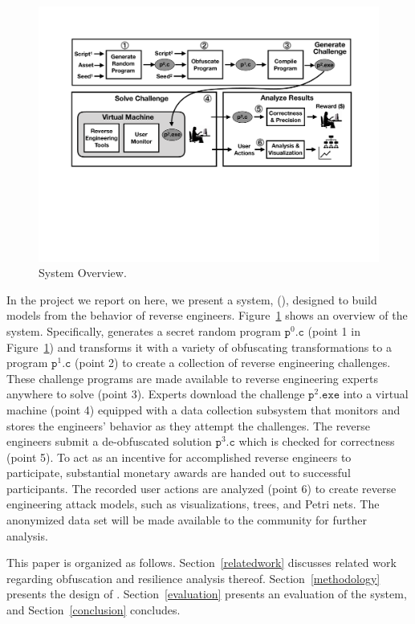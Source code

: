 
\begin{figure}[t]
\vspace*{-15mm}
\hspace*{-7mm}\includegraphics[width=.55\textwidth]{system.pdf}
\vspace*{-30mm}
\caption{System Overview.}
\label{system}
\end{figure}

In the project we report on here, we present a system, \revenge (\revengeExplanation), designed to build models from the behavior of reverse engineers. Figure~\ref{system} shows an overview of the system. Specifically, \revenge generates a secret random program $\mathtt{p}^0.\mathtt{c}$ (point 1 in Figure~\ref{system}) and transforms it with a variety of obfuscating transformations to a program $\mathtt{p}^1.\mathtt{c}$ (point 2) to create a collection of reverse engineering challenges. These challenge programs are made available to reverse engineering experts anywhere to solve (point 3). Experts download the challenge $\mathtt{p}^2.\mathtt{exe}$ into a virtual machine (point 4) equipped with a data collection subsystem that monitors and stores the engineers' behavior as they attempt the challenges. The reverse engineers submit a de-obfuscated solution $\mathtt{p}^3.\mathtt{c}$ which is checked for correctness (point 5). To act as an incentive for accomplished reverse engineers to participate, substantial monetary awards are handed out to successful participants. The recorded user actions are analyzed (point 6) to create reverse engineering attack models, such as visualizations, trees, and Petri nets. The anonymized data set will be made available to the community for further analysis.

This paper is organized as follows.  Section~\ref{relatedwork} discusses related work regarding obfuscation and resilience analysis thereof.  Section~\ref{methodology} presents the design of \revenge. Section~\ref{evaluation} presents an evaluation of the system, and Section~\ref{conclusion} concludes.



